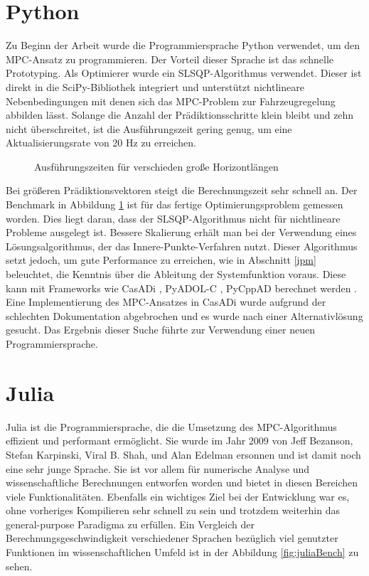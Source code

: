 \documentclass{like}
\begin{document}
\section{Python}

Zu Beginn der Arbeit wurde die Programmiersprache Python verwendet, um den \ac{MPC}-Ansatz zu programmieren. Der Vorteil dieser Sprache ist das schnelle Prototyping. Als Optimierer wurde ein \ac{SLSQP}-Algorithmus verwendet. Dieser ist direkt in die SciPy-Bibliothek \cite{Scipy} integriert und unterstützt nichtlineare Nebenbedingungen mit denen sich das \ac{MPC}-Problem zur Fahrzeugregelung abbilden lässt. Solange die Anzahl der Prädiktionsschritte klein bleibt und zehn nicht überschreitet, ist die Ausführungszeit gering genug, um eine Aktualisierungsrate von 20 Hz zu erreichen. 

\begin{figure}[ht!]
	\centering
	 
	\caption{Ausführungszeiten für verschieden  große Horizontlängen}
	\label{fig:pythonBench}
\end{figure}

Bei größeren Prädiktionsvektoren steigt die Berechnungszeit sehr schnell an. Der Benchmark in Abbildung \ref{fig:pythonBench} ist für das fertige Optimierungsproblem gemessen worden.
Dies liegt daran, dass der \ac{SLSQP}-Algorithmus nicht für nichtlineare Probleme ausgelegt ist. Bessere Skalierung erhält man bei der Verwendung eines Lösungsalgorithmus, der das Innere-Punkte-Verfahren nutzt. Dieser Algorithmus setzt jedoch, um gute Performance zu erreichen, wie in Abschnitt \ref{ipm} beleuchtet, die Kenntnis über die Ableitung der Systemfunktion voraus. Diese kann mit Frameworks wie CasADi \cite{CasADi}, PyADOL-C \cite{PYADOLC}, PyCppAD \cite{CppAD} berechnet werden \cite{DBLP:journals/corr/TurkinT16}. 
Eine Implementierung des \ac{MPC}-Ansatzes in CasADi wurde  aufgrund der schlechten Dokumentation abgebrochen und es wurde nach einer Alternativlösung gesucht. Das Ergebnis dieser Suche führte zur Verwendung einer neuen Programmiersprache. 


\section{Julia}
\label{julia}
Julia ist die Programmiersprache, die die Umsetzung des \acl{MPC}-Algorithmus effizient und performant ermöglicht. Sie wurde im Jahr 2009 von Jeff Bezanson, Stefan Karpinski, Viral B. Shah, und Alan Edelman ersonnen und ist damit noch eine sehr junge Sprache. Sie ist vor allem für numerische Analyse und wissenschaftliche Berechnungen entworfen worden und bietet in diesen Bereichen viele Funktionalitäten. Ebenfalls ein wichtiges Ziel bei der Entwicklung war es, ohne vorheriges Kompilieren sehr schnell zu sein und trotzdem weiterhin das general-purpose Paradigma zu erfüllen. Ein Vergleich der Berechnungsgeschwindigkeit verschiedener Sprachen bezüglich viel genutzter Funktionen im wissenschaftlichen Umfeld ist in der Abbildung \ref{fig:juliaBench} zu sehen.
\end{document}
